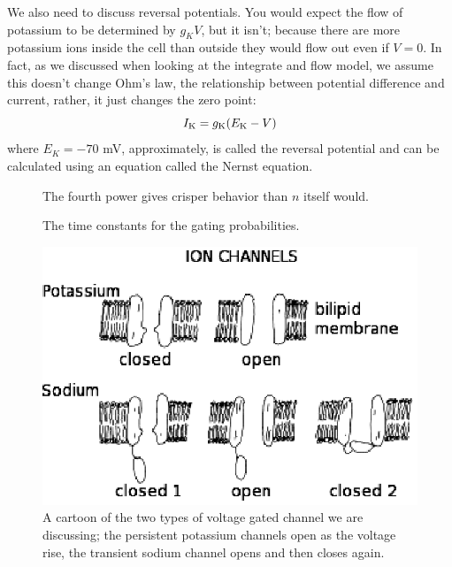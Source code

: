 \documentclass[12pt]{article}
\begin{document}
We also need to discuss reversal potentials. You would expect the flow
of potassium to be determined by $g_KV$, but it isn't; because there
are more potassium ions inside the cell than outside they would flow
out even if $V=0$. In fact, as we discussed when looking at the
integrate and flow model, we assume this doesn't change Ohm's law, the
relationship between potential difference and current, rather, it just
changes the zero point:
\begin{equation}
I_{\mbox{\scriptsize{K}}}=g_{\mbox{\scriptsize{K}}}(E_{\mbox{\scriptsize{K}}}-V)
\end{equation}
where $E_K=-70$ mV, approximately, is called the reversal potential
and can be calculated using an equation called the Nernst equation.

\begin{figure}
\begin{center}

\end{center}
\caption{The fourth power gives crisper behavior than $n$ itself would.\label{fig:nfour}}
\end{figure}


\begin{figure}
\begin{center}

\end{center}
\caption{The time constants for the gating probabilities.\label{fig:tau_vals}}
\end{figure}


\begin{figure}
\begin{center}
\includegraphics{ChannelsBlack.eps}
\end{center}
\caption{A cartoon of the two types of voltage gated channel we are
  discussing; the persistent potassium channels open as the voltage
  rise, the transient sodium channel opens and then closes
  again.\label{ChannelsBlack}}
\end{figure}
\end{document}
